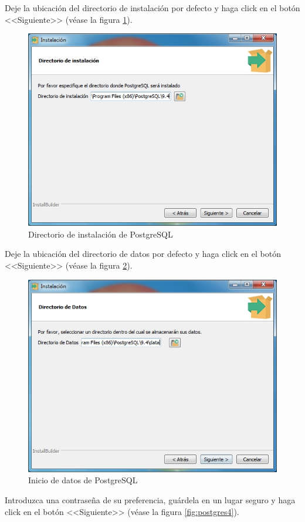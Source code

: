 Deje la ubicaci\'{o}n del directorio de instalaci\'{o}n por defecto y haga click en el bot\'{o}n <<Siguiente>> (v\'{e}ase la figura \ref{fig:postgres2}).

\begin{figure}[H]
  \centering
  \includegraphics[width=.6\linewidth]{./img/postgres2.jpg}
\caption[Directorio de instalaci\'{o}n de PostgreSQL]{Directorio de instalaci\'{o}n de PostgreSQL\label{fig:postgres2}}
\end{figure}

\newpage

Deje la ubicaci\'{o}n del directorio de datos por defecto y haga click en el bot\'{o}n <<Siguiente>> (v\'{e}ase la figura \ref{fig:postgres3}).

\begin{figure}[H]
  \centering
  \includegraphics[width=.6\linewidth]{./img/postgres3.jpg}
\caption[Inicio de datos de PostgreSQL]{Inicio de datos de PostgreSQL\label{fig:postgres3}}
\end{figure}

Introduzca una contrase\~{n}a de su preferencia, gu\'{a}rdela en un lugar seguro y haga click en el bot\'{o}n <<Siguiente>> (v\'{e}ase la figura \ref{fig:postgres4}).

